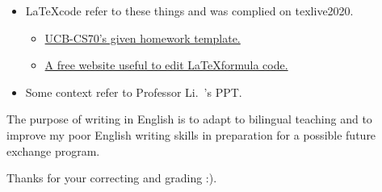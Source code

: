 \documentclass[11pt]{article}  %
\begin{document}
\begin{itemize}
    \item \LaTeX \space code refer to these things and was complied on texlive2020. 
    \begin{itemize}
        \item  \href{https://www.eecs70.org/assets/misc/homework_template.tex}{UCB-CS70's given homework template.} 
        \item  \href{https://www.latexlive.com}{A free website useful to edit \LaTeX \space formula code.}
    \end{itemize}
    \item Some context refer to Professor Li.~'s PPT.
\end{itemize}

The purpose of writing in English is to adapt to bilingual teaching and to improve my poor English 
writing skills in preparation for a possible future exchange program. 

    Thanks for your correcting and grading :).
\end{document}
